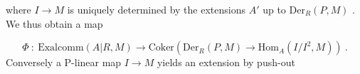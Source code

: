 \begin{center}
\end{center}
where  $I \to M$  is uniquely determined by the extensions  $A'$  up to  $\mathrm{Der}_R(P, M)$  . We thus obtain a map

\begin{equation*}
\Phi \ : \ \mathrm{Exalcomm}(A|R, M) \to \mathrm{Coker}(\mathrm{Der}_R(P, M) \to \mathrm{Hom}_A(I/I^2, M))  \ .
\end{equation*}
Conversely a P-linear map  $I \to M$  yields an extension by push-out

